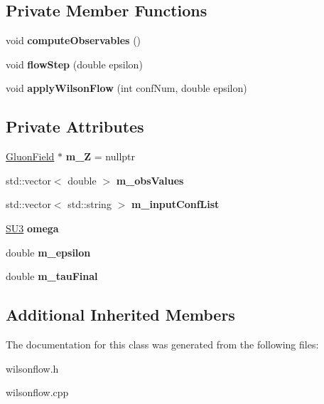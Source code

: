 \subsection*{Private Member Functions}
\begin{DoxyCompactItemize}
\item 
void {\bfseries compute\+Observables} ()\hypertarget{classWilsonFlow_aa9e371b2e2b8b1a24b372030dea6859b}{}\label{classWilsonFlow_aa9e371b2e2b8b1a24b372030dea6859b}

\item 
void {\bfseries flow\+Step} (double epsilon)\hypertarget{classWilsonFlow_a0ae15ce6735575690b3617f79e6cb20f}{}\label{classWilsonFlow_a0ae15ce6735575690b3617f79e6cb20f}

\item 
void {\bfseries apply\+Wilson\+Flow} (int conf\+Num, double epsilon)\hypertarget{classWilsonFlow_a72e7dc884133185d7f5410d212dfe4d5}{}\label{classWilsonFlow_a72e7dc884133185d7f5410d212dfe4d5}

\end{DoxyCompactItemize}
\subsection*{Private Attributes}
\begin{DoxyCompactItemize}
\item 
\hyperlink{classField}{Gluon\+Field} $\ast$ {\bfseries m\+\_\+Z} = nullptr\hypertarget{classWilsonFlow_ad084fea2d78728ce9f3891c8c6cb475f}{}\label{classWilsonFlow_ad084fea2d78728ce9f3891c8c6cb475f}

\item 
std\+::vector$<$ double $>$ {\bfseries m\+\_\+obs\+Values}\hypertarget{classWilsonFlow_a4c77c1ecf832e6da041ec430cbfec401}{}\label{classWilsonFlow_a4c77c1ecf832e6da041ec430cbfec401}

\item 
std\+::vector$<$ std\+::string $>$ {\bfseries m\+\_\+input\+Conf\+List}\hypertarget{classWilsonFlow_a7dadedd9bdec4647e512248d3627d08c}{}\label{classWilsonFlow_a7dadedd9bdec4647e512248d3627d08c}

\item 
\hyperlink{structSU3}{S\+U3} {\bfseries omega}\hypertarget{classWilsonFlow_a991660c79ba24a305baa7bdf6ea146d8}{}\label{classWilsonFlow_a991660c79ba24a305baa7bdf6ea146d8}

\item 
double {\bfseries m\+\_\+epsilon}\hypertarget{classWilsonFlow_a83a352e3cb1cc2a39d48dd96d8e7e581}{}\label{classWilsonFlow_a83a352e3cb1cc2a39d48dd96d8e7e581}

\item 
double {\bfseries m\+\_\+tau\+Final}\hypertarget{classWilsonFlow_abe5e34f28b9bd915a0a39d44df1d8d4a}{}\label{classWilsonFlow_abe5e34f28b9bd915a0a39d44df1d8d4a}

\end{DoxyCompactItemize}
\subsection*{Additional Inherited Members}


The documentation for this class was generated from the following files\+:\begin{DoxyCompactItemize}
\item 
wilsonflow.\+h\item 
wilsonflow.\+cpp\end{DoxyCompactItemize}
